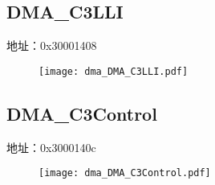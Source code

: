 \subsection{DMA\_C3LLI}
\label{dma-DMA-C3LLI}
地址：0x30001408
 \begin{figure}[H]
\texttt{[image: dma\_DMA\_C3LLI.pdf]}
\end{figure}

\subsection{DMA\_C3Control}
\label{dma-DMA-C3Control}
地址：0x3000140c
 \begin{figure}[H]
\texttt{[image: dma\_DMA\_C3Control.pdf]}
\end{figure}


